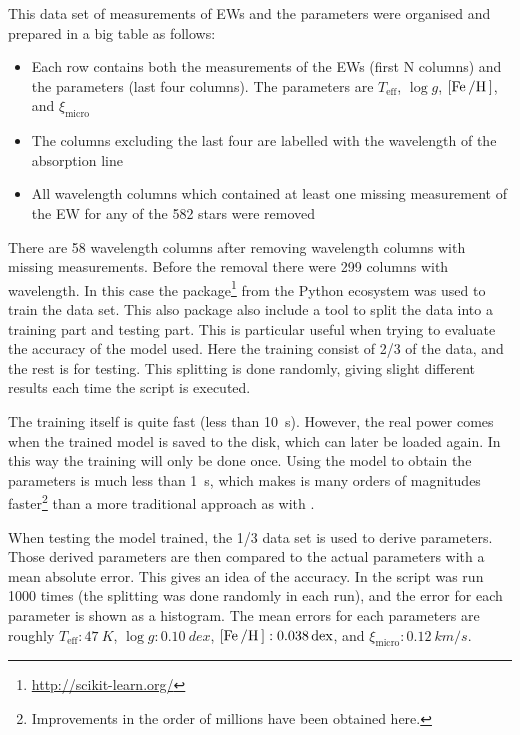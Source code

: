 This data set of measurements of EWs and the parameters were organised and prepared in a big table
as follows:
\begin{itemize}
  \item Each row contains both the measurements of the EWs (first N columns) and the parameters
        (last four columns). The parameters are $T_\mathrm{eff}$, $\log g$, $[\ion{Fe}/\ion{H}]$,
        and $\xi_\mathrm{micro}$
  \item The columns excluding the last four are labelled with the wavelength of the absorption line
  \item All wavelength columns which contained at least one missing measurement of the EW for any
        of the 582 stars were removed
\end{itemize}
There are 58 wavelength columns after removing wavelength columns with missing measurements. Before
the removal there were 299 columns with wavelength. In this case the 
package\footnote{\url{http://scikit-learn.org/}} from the Python ecosystem was used to train the
data set. This also package also include a tool to split the data into a training part and testing
part. This is particular useful when trying to evaluate the accuracy of the model used. Here the
training consist of 2/3 of the data, and the rest is for testing. This splitting is done randomly,
giving slight different results each time the script is executed.

The training itself is quite fast (less than \SI{10}{s}). However, the real power comes when the
trained model is saved to the disk, which can later be loaded again. In this way the training will
only be done once. Using the model to obtain the parameters is much less than \SI{1}{s}, which makes
is many orders of magnitudes faster\footnote{Improvements in the order of millions have been
obtained here.} than a more traditional approach as with .

When testing the model trained, the 1/3 data set is used to derive parameters. Those derived
parameters are then compared to the actual parameters with a mean absolute error. This gives an idea
of the accuracy. In  the script was run 1000 times (the splitting was done randomly in
each run), and the error for each parameter is shown as a histogram. The mean errors for each
parameters are roughly $T_\mathrm{eff}:\SI{47}{K}$, $\log g:\SI{0.10}{dex}$,
$[\ion{Fe}/\ion{H}]:\SI{0.038}{dex}$, and $\xi_\mathrm{micro}:\SI{0.12}{km/s}$.

